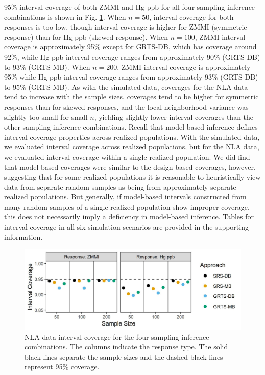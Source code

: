 \documentclass[]{elsarticle} %
\begin{document}
95\% interval coverage of both ZMMI and Hg ppb for all four
sampling-inference combinations is shown in Fig. \ref{fig:data_figconf}.
When \(n = 50\), interval coverage for both responses is too low, though
interval coverage is higher for ZMMI (symmetric response) than for Hg
ppb (skewed response). When \(n = 100\), ZMMI interval coverage is
approximately 95\% except for GRTS-DB, which has coverage around 92\%,
while Hg ppb interval coverage ranges from approximately 90\% (GRTS-DB)
to 93\% (GRTS-MB). When \(n = 200\), ZMMI interval coverage is
approximately 95\% while Hg ppb interval coverage ranges from
approximately 93\% (GRTS-DB) to 95\% (GRTS-MB). As with the simulated
data, coverages for the NLA data tend to increase with the sample sizes,
coverages tend to be higher for symmetric responses than for skewed
responses, and the local neighborhood variance was slightly too small
for small \(n\), yielding slightly lower interval coverages than the
other sampling-inference combinations. Recall that model-based inference
defines interval coverage properties across realized populations. With
the simulated data, we evaluated interval coverage across realized
populations, but for the NLA data, we evaluated interval coverage within
a single realized population. We did find that model-based coverages
were similar to the design-based coverages, however, suggesting that for
some realized populations it is reasonable to heuristically view data
from separate random samples as being from approximately separate
realized populations. But generally, if model-based intervals
constructed from many random samples of a single realized population
show improper coverage, this does not necessarily imply a deficiency in
model-based inference. Tables for interval coverage in all six
simulation scenarios are provided in the supporting information.

\begin{figure}
  \centering
  \includegraphics[width = 1\linewidth]{figures/data_coverage.jpeg}
  \caption{NLA data interval coverage for the four sampling-inference combinations. The columns indicate the response type. The solid black lines separate the sample sizes and the dashed black lines represent 95\% coverage.}
  \label{fig:data_figconf}
\end{figure}
\end{document}
